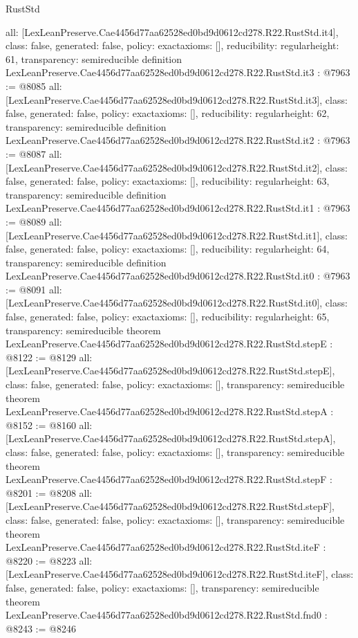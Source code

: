 \begin{lexlean}{RustStd}
\begin{coremodule}
{  all: [LexLeanPreserve.Cae4456d77aa62528ed0bd9d0612cd278.R22.RustStd.it4],
  class: false,
  generated: false,
  policy: exact{axioms: []},
  reducibility: regular{height: 61},
  transparency: semireducible
}
definition LexLeanPreserve.Cae4456d77aa62528ed0bd9d0612cd278.R22.RustStd.it3 : @7963 := @8085 {
  all: [LexLeanPreserve.Cae4456d77aa62528ed0bd9d0612cd278.R22.RustStd.it3],
  class: false,
  generated: false,
  policy: exact{axioms: []},
  reducibility: regular{height: 62},
  transparency: semireducible
}
definition LexLeanPreserve.Cae4456d77aa62528ed0bd9d0612cd278.R22.RustStd.it2 : @7963 := @8087 {
  all: [LexLeanPreserve.Cae4456d77aa62528ed0bd9d0612cd278.R22.RustStd.it2],
  class: false,
  generated: false,
  policy: exact{axioms: []},
  reducibility: regular{height: 63},
  transparency: semireducible
}
definition LexLeanPreserve.Cae4456d77aa62528ed0bd9d0612cd278.R22.RustStd.it1 : @7963 := @8089 {
  all: [LexLeanPreserve.Cae4456d77aa62528ed0bd9d0612cd278.R22.RustStd.it1],
  class: false,
  generated: false,
  policy: exact{axioms: []},
  reducibility: regular{height: 64},
  transparency: semireducible
}
definition LexLeanPreserve.Cae4456d77aa62528ed0bd9d0612cd278.R22.RustStd.it0 : @7963 := @8091 {
  all: [LexLeanPreserve.Cae4456d77aa62528ed0bd9d0612cd278.R22.RustStd.it0],
  class: false,
  generated: false,
  policy: exact{axioms: []},
  reducibility: regular{height: 65},
  transparency: semireducible
}
theorem LexLeanPreserve.Cae4456d77aa62528ed0bd9d0612cd278.R22.RustStd.stepE : @8122 := @8129 {
  all: [LexLeanPreserve.Cae4456d77aa62528ed0bd9d0612cd278.R22.RustStd.stepE],
  class: false,
  generated: false,
  policy: exact{axioms: []},
  transparency: semireducible
}
theorem LexLeanPreserve.Cae4456d77aa62528ed0bd9d0612cd278.R22.RustStd.stepA : @8152 := @8160 {
  all: [LexLeanPreserve.Cae4456d77aa62528ed0bd9d0612cd278.R22.RustStd.stepA],
  class: false,
  generated: false,
  policy: exact{axioms: []},
  transparency: semireducible
}
theorem LexLeanPreserve.Cae4456d77aa62528ed0bd9d0612cd278.R22.RustStd.stepF : @8201 := @8208 {
  all: [LexLeanPreserve.Cae4456d77aa62528ed0bd9d0612cd278.R22.RustStd.stepF],
  class: false,
  generated: false,
  policy: exact{axioms: []},
  transparency: semireducible
}
theorem LexLeanPreserve.Cae4456d77aa62528ed0bd9d0612cd278.R22.RustStd.iteF : @8220 := @8223 {
  all: [LexLeanPreserve.Cae4456d77aa62528ed0bd9d0612cd278.R22.RustStd.iteF],
  class: false,
  generated: false,
  policy: exact{axioms: []},
  transparency: semireducible
}
theorem LexLeanPreserve.Cae4456d77aa62528ed0bd9d0612cd278.R22.RustStd.fnd0 : @8243 := @8246 {
}
\end{coremodule}
\end{lexlean}
